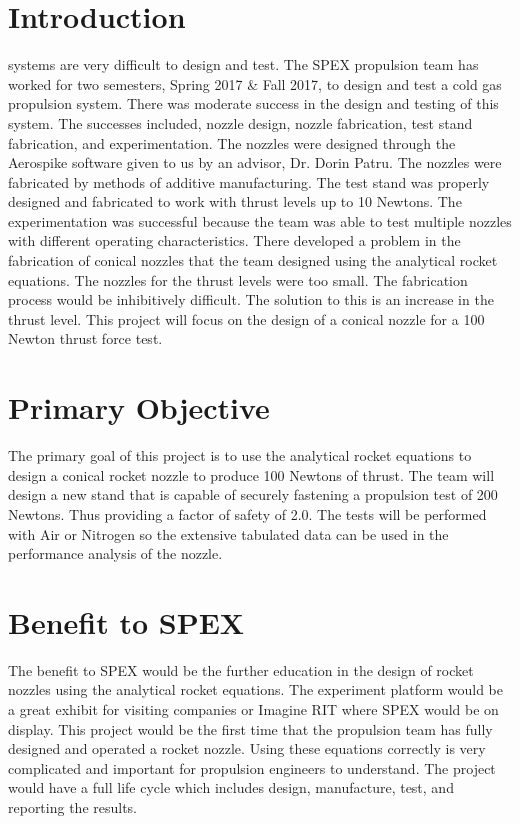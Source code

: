 \documentclass[conference]{IEEEtran} %
\begin{document}
\section{Introduction}
\label{sec:introduction}
 systems are very difficult to design and test. The SPEX propulsion team has worked for two semesters, Spring 2017 & Fall 2017, to design and test a cold gas propulsion system.
There was moderate success in the design and testing of this system. The successes included, nozzle design, nozzle fabrication, test stand fabrication, and experimentation.
The nozzles were designed through the Aerospike software given to us by an advisor, Dr. Dorin Patru. The nozzles were fabricated by methods of additive manufacturing.
The test stand was properly designed and fabricated to work with thrust levels up to 10 Newtons. The experimentation was successful because
the team was able to test multiple nozzles with different operating characteristics. There developed a problem in the fabrication of conical nozzles that the team designed using the analytical rocket equations.
The nozzles for the thrust levels were too small. The fabrication process would be inhibitively difficult. The solution to this is an increase in the thrust level.
 This project will focus on the design of a conical nozzle for a 100 Newton thrust force test.

\section{Primary Objective}\label{sec:primary-obj}
The primary goal of this project is to use the analytical rocket equations to design a conical rocket nozzle to produce 100 Newtons of thrust.
The team will design a new stand that is capable of securely fastening a propulsion test of 200 Newtons.
Thus providing a factor of safety of 2.0. The tests will be performed with Air or Nitrogen so the extensive tabulated data can be used in the performance analysis of the nozzle.

\section{Benefit to SPEX}\label{sec:benefit}
The benefit to SPEX would be the further education in the design of rocket nozzles using the analytical rocket equations. The experiment platform would
be a great exhibit for visiting companies or Imagine RIT where SPEX would be on display. This project would be
the first time that the propulsion team has fully designed and operated a rocket nozzle. Using these equations correctly is very complicated and important for
propulsion engineers to understand. The project would have a full life cycle which includes design, manufacture, test, and reporting the results.
\end{document}
